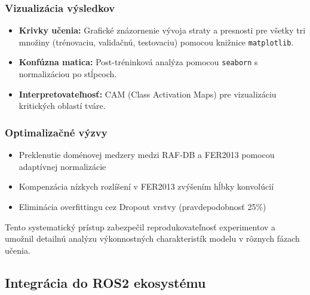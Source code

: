 \subsubsection{Vizualizácia výsledkov}
\begin{itemize}
    \item \textbf{Krivky učenia:} Grafické znázornenie vývoja straty a presnosti pre všetky tri množiny (trénovaciu, validačnú, testovaciu) pomocou knižnice \texttt{matplotlib}.
    \item \textbf{Konfúzna matica:} Post-tréninková analýza pomocou \texttt{seaborn} s normalizáciou po stĺpcoch.
    \item \textbf{Interpretovateľnosť:} CAM (Class Activation Maps) pre vizualizáciu kritických oblastí tváre.
\end{itemize}


\subsubsection{Optimalizačné výzvy}
\begin{itemize}
    \item Preklenutie doménovej medzery medzi RAF-DB a FER2013 pomocou adaptívnej normalizácie
    \item Kompenzácia nízkych rozlíšení v FER2013 zvýšením hĺbky konvolúcií
    \item Eliminácia overfittingu cez Dropout vrstvy (pravdepodobnosť 25\%)
\end{itemize}

Tento systematický prístup zabezpečil reprodukovateľnosť experimentov a umožnil detailnú analýzu výkonnostných charakteristík modelu v rôznych fázach učenia.
\newpage
\subsection{Integrácia do ROS2 ekosystému}

